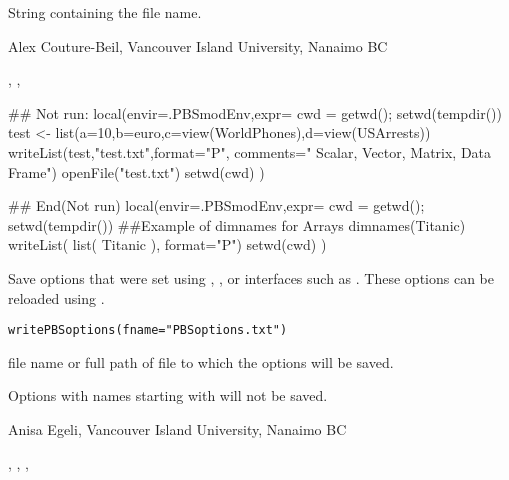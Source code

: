 \documentclass[letterpaper]{book}
\begin{document}
%
\begin{Value}
String containing the file name.
\end{Value}
%
\begin{Author}\relax
Alex Couture-Beil, Vancouver Island University, Nanaimo BC
\end{Author}
%
\begin{SeeAlso}\relax
{}, , 
\end{SeeAlso}
%
\begin{Examples}
\begin{ExampleCode}
## Not run: 
local(envir=.PBSmodEnv,expr={
  cwd = getwd(); setwd(tempdir())
  test <- list(a=10,b=euro,c=view(WorldPhones),d=view(USArrests))
  writeList(test,"test.txt",format="P",
    comments=" Scalar, Vector, Matrix, Data Frame")
  openFile("test.txt")
  setwd(cwd)
})

## End(Not run)
local(envir=.PBSmodEnv,expr={
  cwd = getwd(); setwd(tempdir())
  ##Example of dimnames for Arrays
  dimnames(Titanic)
  writeList( list( Titanic ), format="P")
  setwd(cwd)
})
\end{ExampleCode}
\end{Examples}
%
\begin{Description}\relax
Save options that were set using ,
, or interfaces such as .  
These options can be reloaded using .
\end{Description}
%
\begin{Usage}
\begin{verbatim}
writePBSoptions(fname="PBSoptions.txt")
\end{verbatim}
\end{Usage}
%
\begin{Arguments}
\begin{ldescription}
\item[\code{fname}] file name or full path of file to which the options will be saved.
\end{ldescription}
\end{Arguments}
%
\begin{Note}\relax
Options with names starting with  will not be saved.
\end{Note}
%
\begin{Author}\relax
Anisa Egeli, Vancouver Island University, Nanaimo BC
\end{Author}
%
\begin{SeeAlso}\relax
{}, ,
, 
\end{SeeAlso}
\printindex{}
\end{document}
